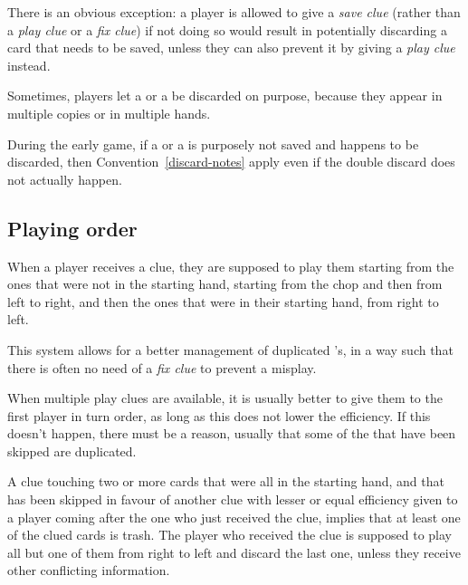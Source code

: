 There is an obvious exception: a player is allowed to give a \emph{save clue} (rather than a \emph{play clue} or a \emph{fix clue}) if not doing so would result in potentially discarding a card that needs to be saved, unless they can also prevent it by giving a \emph{play clue} instead.

Sometimes, players let a  or a  be discarded on purpose, because they appear in multiple copies or in multiple hands.

\begin{convention}
	During the early game, if a  or a  is purposely not saved and happens to be discarded, then Convention~\ref{discard-notes} apply even if the double discard does not actually happen.
\end{convention}

\subsection{Playing order}

\begin{convention}
	When a player receives a  clue, they are supposed to play them starting from the ones that were not in the starting hand, starting from the chop and then from left to right, and then the ones that were in their starting hand, from right to left.
\end{convention}

This system allows for a better management of duplicated 's, in a way such that there is often no need of a \emph{fix clue} to prevent a misplay.

When multiple play clues are available, it is usually better to give them to the first player in turn order, as long as this does not lower the efficiency. If this doesn't happen, there must be a reason, usually that some of the  that have been skipped are duplicated.

\begin{convention}[Skipped 1's]
	A  clue touching two or more cards that were all in the starting hand, and that has been skipped in favour of another clue with lesser or equal efficiency given to a player coming after the one who just received the clue, implies that at least one of the clued cards is trash. The player who received the clue is supposed to play all but one of them from right to left and discard the last one, unless they receive other conflicting information.
\end{convention}


